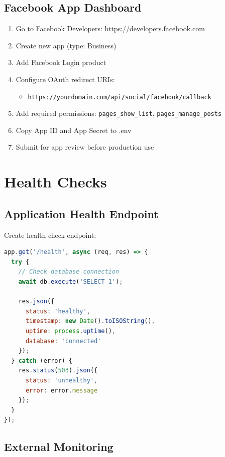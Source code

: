 \subsection{Facebook App Dashboard}

\begin{enumerate}
    \item Go to Facebook Developers: \url{https://developers.facebook.com}
    \item Create new app (type: Business)
    \item Add Facebook Login product
    \item Configure OAuth redirect URIs:
    \begin{itemize}
        \item \texttt{https://yourdomain.com/api/social/facebook/callback}
    \end{itemize}
    \item Add required permissions: \texttt{pages\_show\_list}, \texttt{pages\_manage\_posts}
    \item Copy App ID and App Secret to .env
    \item Submit for app review before production use
\end{enumerate}

\section{Health Checks}

\subsection{Application Health Endpoint}

Create health check endpoint:

\begin{lstlisting}[language=JavaScript, caption=server/routes.ts - Health check]
app.get('/health', async (req, res) => {
  try {
    // Check database connection
    await db.execute('SELECT 1');
    
    res.json({
      status: 'healthy',
      timestamp: new Date().toISOString(),
      uptime: process.uptime(),
      database: 'connected'
    });
  } catch (error) {
    res.status(503).json({
      status: 'unhealthy',
      error: error.message
    });
  }
});
\end{lstlisting}

\subsection{External Monitoring}

